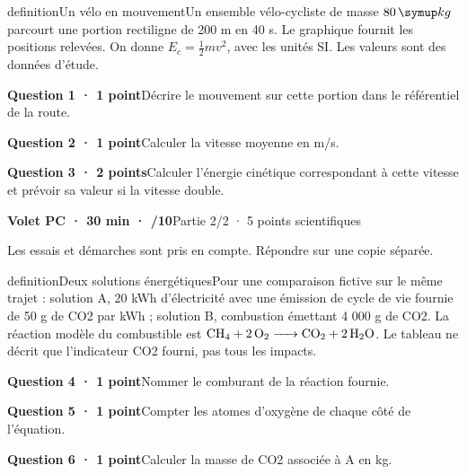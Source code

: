 \begin{pcEncadre}{definition}{Un vélo en mouvement}Un ensemble vélo-cycliste de masse $80\unite{kg}$ parcourt une portion rectiligne de 200 m en 40 s. Le graphique fournit les positions relevées. On donne $E_c=\tfrac12 mv^2$, avec les unités SI. Les valeurs sont des données d’étude.\end{pcEncadre}
\par\addvspace{3mm}\noindent\textbf{Question 1 · 1 point}\quad Décrire le mouvement sur cette portion dans le référentiel de la route.\par
\par\addvspace{3mm}\noindent\textbf{Question 2 · 1 point}\quad Calculer la vitesse moyenne en m/s.\par
\par\addvspace{3mm}\noindent\textbf{Question 3 · 2 points}\quad Calculer l’énergie cinétique correspondant à cette vitesse et prévoir sa valeur si la vitesse double.\par
\vfill{}
\noindent\textbf{Volet PC · 30 min · /10}\hfill Partie 2/2 · 5 points scientifiques
\par\vspace{2mm}Les essais et démarches sont pris en compte. Répondre sur une copie séparée.\par
\begin{pcEncadre}{definition}{Deux solutions énergétiques}Pour une comparaison fictive sur le même trajet : solution A, 20 kWh d’électricité avec une émission de cycle de vie fournie de 50 g de CO2 par kWh ; solution B, combustion émettant 4 000 g de CO2. La réaction modèle du combustible est $\ce{CH4 + 2 O2 -> CO2 + 2 H2O}$. Le tableau ne décrit que l’indicateur CO2 fourni, pas tous les impacts.\end{pcEncadre}
\par\addvspace{3mm}\noindent\textbf{Question 4 · 1 point}\quad Nommer le comburant de la réaction fournie.\par
\par\addvspace{3mm}\noindent\textbf{Question 5 · 1 point}\quad Compter les atomes d’oxygène de chaque côté de l’équation.\par
\par\addvspace{3mm}\noindent\textbf{Question 6 · 1 point}\quad Calculer la masse de CO2 associée à A en kg.\par
